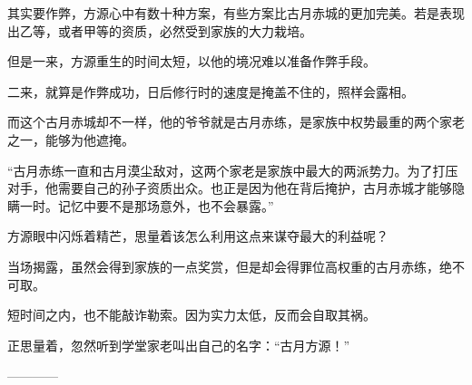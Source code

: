 \begin{this_body}
其实要作弊，方源心中有数十种方案，有些方案比古月赤城的更加完美。若是表现出乙等，或者甲等的资质，必然受到家族的大力栽培。

但是一来，方源重生的时间太短，以他的境况难以准备作弊手段。

二来，就算是作弊成功，日后修行时的速度是掩盖不住的，照样会露相。

而这个古月赤城却不一样，他的爷爷就是古月赤练，是家族中权势最重的两个家老之一，能够为他遮掩。

“古月赤练一直和古月漠尘敌对，这两个家老是家族中最大的两派势力。为了打压对手，他需要自己的孙子资质出众。也正是因为他在背后掩护，古月赤城才能够隐瞒一时。记忆中要不是那场意外，也不会暴露。”

方源眼中闪烁着精芒，思量着该怎么利用这点来谋夺最大的利益呢？

当场揭露，虽然会得到家族的一点奖赏，但是却会得罪位高权重的古月赤练，绝不可取。

短时间之内，也不能敲诈勒索。因为实力太低，反而会自取其祸。

正思量着，忽然听到学堂家老叫出自己的名字：“古月方源！”

------------

\end{this_body}

